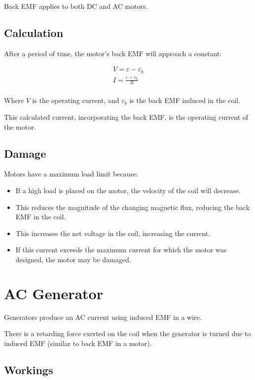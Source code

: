 \documentclass[a4paper,11pt]{article}
\begin{document}
Back EMF applies to both DC and AC motors.


\subsection{Calculation}

After a period of time, the motor's back EMF will approach a constant:

$$
\begin{aligned}
V = \varepsilon - \varepsilon_b \\
I = \frac{\varepsilon - \varepsilon_b}{R} \\
\end{aligned}
$$

Where $V$ is the operating current, and $\varepsilon_b$ is the back EMF
induced in the coil.

This calculated current, incorporating the back EMF, is the operating current
of the motor.


\subsection{Damage}

Motors have a maximum load limit because:

\begin{itemize}
\item If a high load is placed on the motor, the velocity of the coil will
	decrease.
\item This reduces the magnitude of the changing magnetic flux, reducing the
	back EMF in the coil.
\item This increases the net voltage in the coil, increasing the current.
\item If this current exceeds the maximum current for which the motor was
	designed, the motor may be damaged.
\end{itemize}




\section{AC Generator}

Generators produce an AC current using induced EMF in a wire.

There is a retarding force exerted on the coil when the generator is turned due
to induced EMF (similar to back EMF in a motor).


\subsection{Workings}
\end{document}
